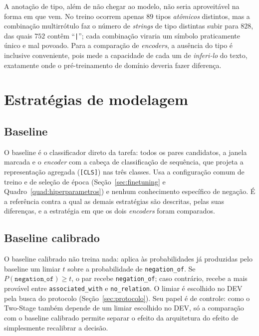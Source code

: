 A anotação de tipo, além de não chegar ao modelo, não seria aproveitável na forma em que vem. No treino ocorrem apenas $89$ tipos
\emph{atômicos} distintos, mas a combinação multirrótulo faz o número de
\emph{strings} de tipo distintas subir para $828$, das quais $752$ contêm
``\texttt{|}''; cada combinação viraria um símbolo praticamente único e mal povoado.
Para a comparação de \emph{encoders}, a ausência do tipo é inclusive conveniente,
pois mede a capacidade de cada um de \emph{inferi-lo} do texto, exatamente onde o
pré-treinamento de domínio deveria fazer diferença.
\label{sec:markers_limitacao}

\section{Estratégias de modelagem}
\label{sec:estrategias}

\subsection{Baseline}
\label{sec:baseline}

O baseline é o classificador direto da tarefa: todos os pares candidatos, a janela
marcada e o \emph{encoder} com a cabeça de classificação de sequência, que projeta a
representação agregada (\texttt{[CLS]}) nas três classes. Usa a configuração comum
de treino e de seleção de época (Seção~\ref{sec:finetuning} e
Quadro~\ref{quad:hiperparametros}) e nenhum conhecimento específico de negação. É a
referência contra a qual as demais estratégias são descritas, pelas suas diferenças,
e a estratégia em que os dois \emph{encoders} foram comparados.

\subsection{Baseline calibrado}
\label{sec:calibrado}

O baseline calibrado não treina nada: aplica às probabilidades já produzidas pelo
baseline um limiar $t$ sobre a probabilidade de \texttt{negation\_of}. Se
$P(\texttt{negation\_of}) \geq t$, o par recebe \texttt{negation\_of}; caso contrário,
recebe a mais provável entre \texttt{associated\_with} e \texttt{no\_relation}. O
limiar é escolhido no DEV pela busca do protocolo (Seção~\ref{sec:protocolo}). Seu
papel é de controle: como o Two-Stage também depende de um limiar escolhido
no DEV, só a comparação com o baseline calibrado permite separar o efeito da
arquitetura do efeito de simplesmente recalibrar a decisão.

